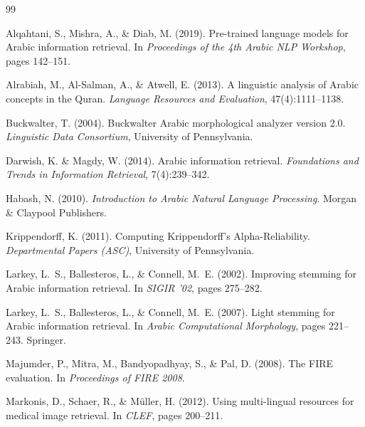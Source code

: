 \documentclass[preprint,12pt,authoryear]{elsarticle}
\begin{document}
\begin{thebibliography}{99}

Alqahtani, S., Mishra, A., \& Diab, M. (2019).
\newblock Pre-trained language models for Arabic information retrieval.
\newblock In \textit{Proceedings of the 4th Arabic NLP Workshop}, pages 142--151.

Alrabiah, M., Al-Salman, A., \& Atwell, E. (2013).
\newblock A linguistic analysis of Arabic concepts in the Quran.
\newblock \textit{Language Resources and Evaluation}, 47(4):1111--1138.

Buckwalter, T. (2004).
\newblock Buckwalter Arabic morphological analyzer version 2.0.
\newblock \textit{Linguistic Data Consortium}, University of Pennsylvania.

Darwish, K. \& Magdy, W. (2014).
\newblock Arabic information retrieval.
\newblock \textit{Foundations and Trends in Information Retrieval}, 7(4):239--342.

Habash, N. (2010).
\newblock \textit{Introduction to Arabic Natural Language Processing}.
\newblock Morgan \& Claypool Publishers.

Krippendorff, K. (2011).
\newblock Computing Krippendorff's Alpha-Reliability.
\newblock \textit{Departmental Papers (ASC)}, University of Pennsylvania.

Larkey, L.~S., Ballesteros, L., \& Connell, M.~E. (2002).
\newblock Improving stemming for Arabic information retrieval.
\newblock In \textit{SIGIR '02}, pages 275--282.

Larkey, L.~S., Ballesteros, L., \& Connell, M.~E. (2007).
\newblock Light stemming for Arabic information retrieval.
\newblock In \textit{Arabic Computational Morphology}, pages 221--243. Springer.

Majumder, P., Mitra, M., Bandyopadhyay, S., \& Pal, D. (2008).
\newblock The FIRE evaluation.
\newblock In \textit{Proceedings of FIRE 2008}.

Markonis, D., Schaer, R., \& M{\"u}ller, H. (2012).
\newblock Using multi-lingual resources for medical image retrieval.
\newblock In \textit{CLEF}, pages 200--211.


\end{thebibliography}
\end{document}
